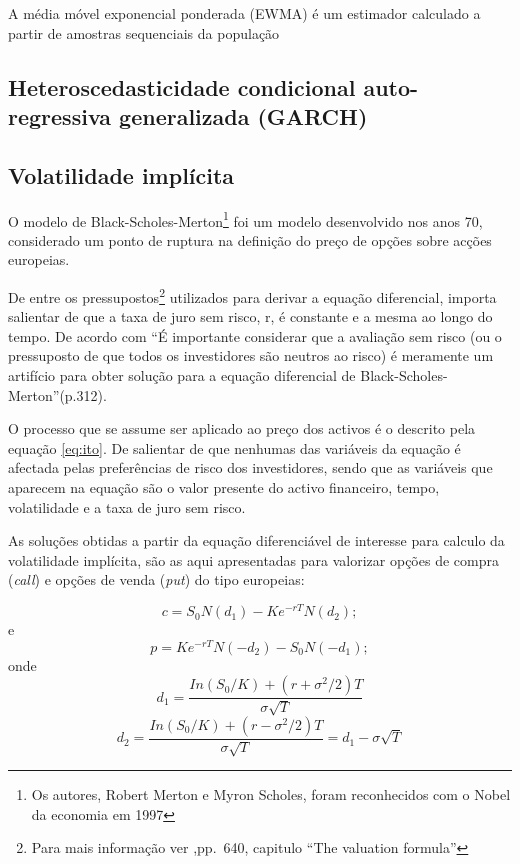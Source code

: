 \documentclass[
  12pt,
  a4paper,
  openany]{book}
\begin{document}
A média móvel exponencial ponderada (EWMA) é um estimador calculado a partir de amostras sequenciais da população

\hypertarget{heteroscedasticidade-condicional-auto-regressiva-generalizada-garch}{%
\subsection{Heteroscedasticidade condicional auto-regressiva generalizada (GARCH)}\label{heteroscedasticidade-condicional-auto-regressiva-generalizada-garch}}

\hypertarget{volatilidade-impluxedcita}{%
\subsection{Volatilidade implícita}\label{volatilidade-impluxedcita}}

O modelo de Black-Scholes-Merton\footnote{Os autores, Robert Merton e Myron Scholes, foram reconhecidos com o Nobel da economia em 1997} foi um modelo desenvolvido nos anos 70, considerado um ponto de ruptura na definição do preço de opções sobre acções europeias.

De entre os pressupostos\footnote{Para mais informação ver \citet{BlackScholes},pp.~640, capitulo ``The valuation formula''} utilizados para derivar a equação diferencial, importa salientar de que a taxa de juro sem risco, r, é constante e a mesma ao longo do tempo. De acordo com \citet{Hull2018} ``É importante considerar que a avaliação sem risco (ou o pressuposto de que todos os investidores são neutros ao risco) é meramente um artifício para obter solução para a equação diferencial de Black-Scholes-Merton''(p.312).

O processo que se assume ser aplicado ao preço dos activos é o descrito pela equação \eqref{eq:ito}. De salientar de que nenhumas das variáveis da equação é afectada pelas preferências de risco dos investidores, sendo que as variáveis que aparecem na equação são o valor presente do activo financeiro, tempo, volatilidade e a taxa de juro sem risco.

As soluções obtidas a partir da equação diferenciável de interesse para calculo da volatilidade implícita, são as aqui apresentadas para valorizar opções de compra (\emph{call}) e opções de venda (\emph{put}) do tipo europeias:

\begin{equation} 
  c = S_0N(d_1) - Ke^{-rT}N(d_2);
  \label{eq:call}
\end{equation}
e
\begin{equation} 
  p = Ke^{-rT}N(-d_2) - S_0N(-d_1);
  \label{eq:put}
\end{equation}
onde
\begin{equation} 
  d_1 = \frac{In(S_0/K)+(r+\sigma^2/2)T}{\sigma\sqrt{T}}
  \label{eq:d1}
\end{equation}
\begin{equation} 
  d_2 = \frac{In(S_0/K)+(r-\sigma^2/2)T}{\sigma\sqrt{T}}=d_1-\sigma\sqrt{T}
  \label{eq:d2}
\end{equation}
\end{document}
